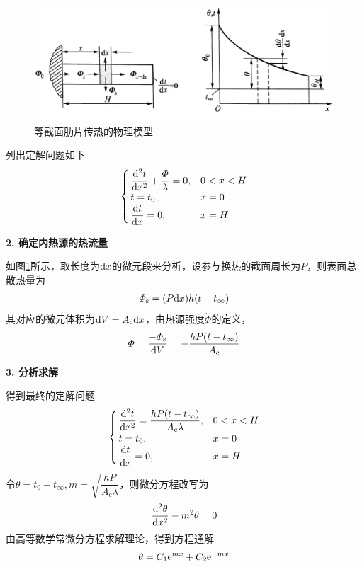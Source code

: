 \begin{figure}[!htb]
	\vspace*{-1em}
	\centering
	\includegraphics[width=0.8\linewidth]{pic/等截面肋片2.jpeg}
	\vspace*{-1.5em}
	\caption{等截面肋片传热的物理模型}
	\label{等截面肋片传热的物理模型}
\end{figure}
列出定解问题如下
\begin{align}
		\begin{cases}
			\, \dfrac{{\rm{d}}^2 t}{{\rm{d}} x^2}  + \dfrac{\dot{\varPhi}}{\lambda}= 0, & 0< x< H\\
			\, t = t_0, & x = 0\\
			\, \dfrac{{\rm{d}} t}{{\rm{d}} x} = 0, & x = H
		\end{cases}
\end{align}

\noindent \textbf{2. 确定内热源的热流量}

如图\ref{等截面肋片传热的物理模型}所示，取长度为${\rm{d}} x$的微元段来分析，设参与换热的截面周长为$P$，则表面总散热量为
\begin{align}
	\varPhi_{\text{s}} = (P {\rm{d}} x) h (t - t_\infty)
\end{align}
其对应的微元体积为${\rm{d}} V = A_{\text{c}} {\rm{d}} x$，由热源强度$\dot{\varPhi}$的定义，
\begin{align}
	\dot{\varPhi} = \dfrac{-\varPhi_{\text{s}}}{{\rm{d}} V} = -\dfrac{h P (t - t_\infty)}{A_{\text{c}}}
\end{align}

\noindent \textbf{3. 分析求解}

得到最终的定解问题
\begin{align}
	\begin{cases}
		\, \dfrac{{\rm{d}}^2 t}{{\rm{d}} x^2}  = \dfrac{h P (t - t_\infty)}{A_{\text{c}}\lambda}, & 0< x< H\\
		\, t = t_0, & x = 0\\
		\, \dfrac{{\rm{d}} t}{{\rm{d}} x} = 0, & x = H
	\end{cases}
\end{align}
令$\theta = t_0 - t_\infty, m = \sqrt{\dfrac{h P}{A_{\text{c}}\lambda}}$，则微分方程改写为
\begin{align}
	\dfrac{{\rm{d}}^2 \theta}{{\rm{d}} x^2} - m^2 \theta = 0
\end{align}
由高等数学常微分方程求解理论，得到方程通解
\begin{align}
	\theta = C_1 {\rm{e}}^{mx} + C_2 {\rm{e}}^{-mx}
\end{align}

